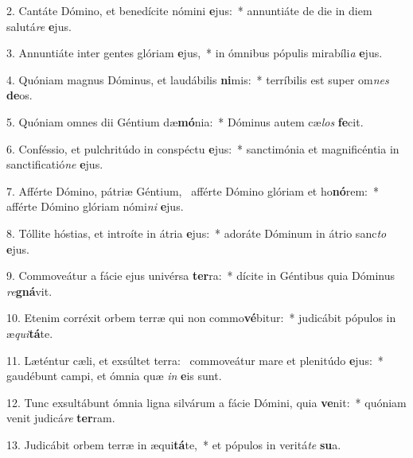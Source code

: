 2. Cantáte Dómino, et benedícite nómini \textbf{e}jus:~*  annuntiáte de die in diem salutá\textit{re} \textbf{e}jus.\

3. Annuntiáte inter gentes glóriam \textbf{e}jus,~*  in ómnibus pópulis mirabíli\textit{a} \textbf{e}jus.\

4. Quóniam magnus Dóminus, et laudábilis \textbf{ni}mis:~*  terríbilis est super om\textit{nes} \textbf{de}os.\

5. Quóniam omnes dii Géntium dæ\textbf{mó}nia:~*  Dóminus autem cæ\textit{los} \textbf{fe}cit.\

6. Conféssio, et pulchritúdo in conspéctu \textbf{e}jus:~*  sanctimónia et magnificéntia in sanctificatió\textit{ne} \textbf{e}jus.\

7. Afférte Dómino, pátriæ Géntium, \dag\  afférte Dómino glóriam et ho\textbf{nó}rem:~*  afférte Dómino glóriam nómi\textit{ni} \textbf{e}jus.\

8. Tóllite hóstias, et introíte in átria \textbf{e}jus:~*  adoráte Dóminum in átrio sanc\textit{to} \textbf{e}jus.\

9. Commoveátur a fácie ejus univérsa \textbf{ter}ra:~*  dícite in Géntibus quia Dóminus \textit{re}\textbf{gná}vit.\

10. Etenim corréxit orbem terræ qui non commo\textbf{vé}bitur:~*  judicábit pópulos in æ\textit{qui}\textbf{tá}te.\

11. Læténtur cæli, et exsúltet terra: \dag\  commoveátur mare et plenitúdo \textbf{e}jus:~*  gaudébunt campi, et ómnia quæ \textit{in} \textbf{e}is sunt.\

12. Tunc exsultábunt ómnia ligna silvárum a fácie Dómini, quia \textbf{ve}nit:~*  quóniam venit judicá\textit{re} \textbf{ter}ram.\

13. Judicábit orbem terræ in æqui\textbf{tá}te,~*  et pópulos in veritá\textit{te} \textbf{su}a.\

